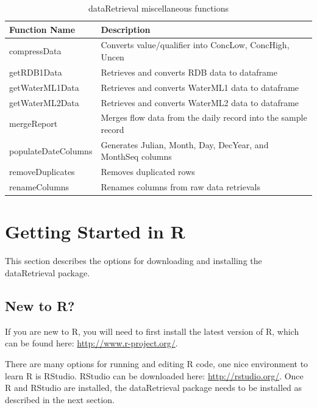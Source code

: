 \documentclass[a4paper,11pt]{article}\usepackage[]{graphicx}\usepackage[]{color}
\begin{document}
\begin{table}[!ht]
\begin{minipage}{\linewidth}
\begin{center}
\caption{dataRetrieval miscellaneous functions} 
\label{tab:dataRetrievalMisc}
\begin{tabular}{ll}
  \hline
Function Name & Description \\ 
  \hline
  compressData &  Converts value/qualifier into ConcLow, ConcHigh, Uncen\\
  getRDB1Data & Retrieves and converts RDB data to dataframe\\
  getWaterML1Data & Retrieves and converts WaterML1 data to dataframe\\
  getWaterML2Data & Retrieves and converts WaterML2 data to dataframe\\
  mergeReport & Merges flow data from the daily record into the sample record\\
  populateDateColumns & Generates Julian, Month, Day, DecYear, and MonthSeq columns\\
  removeDuplicates & Removes duplicated rows\\
  renameColumns & Renames columns from raw data retrievals\\
   \hline
\end{tabular}
\end{center}
\end{minipage}
\end{table}

\FloatBarrier
\clearpage


\section{Getting Started in R}
\label{sec:appendix1}
This section describes the options for downloading and installing the dataRetrieval package.

\subsection{New to R?}
If you are new to R, you will need to first install the latest version of R, which can be found here: \url{http://www.r-project.org/}.

There are many options for running and editing R code, one nice environment to learn R is RStudio. RStudio can be downloaded here: \url{http://rstudio.org/}. Once R and RStudio are installed, the dataRetrieval package needs to be installed as described in the next section.
\end{document}
